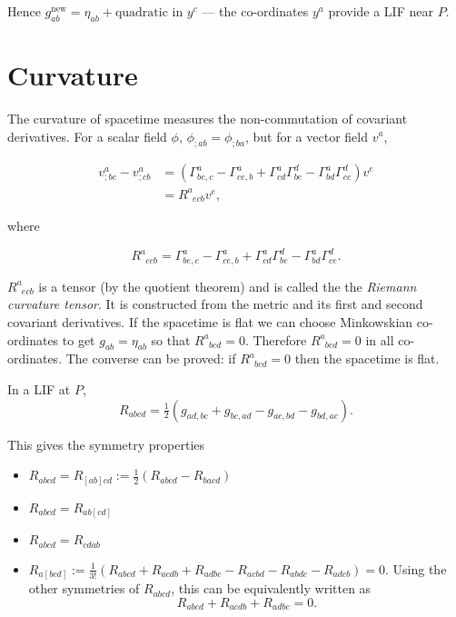 \documentclass{notes}
\begin{document}
Hence $g^{\text{new}}_{ab} = \eta_{ab} + \text{quadratic in $y^c$}$
--- the co-ordinates $y^a$ provide a LIF near $P$.

\section{Curvature}

The curvature of spacetime measures the non-commutation of covariant
derivatives.  For a scalar field $\phi$, $\phi_{;ab} = \phi_{;ba}$,
but for a vector field $v^a$,

\begin{align*}
v^a_{;bc} - v^a_{;cb} &= \left( \Gamma^a_{be,c} - \Gamma^a_{ce,b}
+ \Gamma^a_{cd} \Gamma^d_{be} - \Gamma^a_{bd} \Gamma^d_{ce}
\right) v^e \\
&= R^a_{\phantom{a} e c b} v^e,
\end{align*}

where

\[
R^a_{\phantom{a} e c b} = \Gamma^a_{be,c} - \Gamma^a_{ce,b}
+ \Gamma^a_{cd} \Gamma^d_{be} - \Gamma^a_{bd} \Gamma^d_{ce}.
\]

$R^a_{\phantom{a} e c b}$ is a tensor (by the quotient theorem) and is
called the the \emph{Riemann curvature tensor}.  It is constructed
from the metric and its first and second covariant derivatives.  If
the spacetime is flat we can choose Minkowskian co-ordinates to get
$g_{ab} = \eta_{ab}$ so that $R^a_{\phantom{a}bcd} = 0$.  Therefore
$R^a_{\phantom{a}bcd} = 0$ in all co-ordinates.  The converse can be
proved: if $R^a_{\phantom{a}bcd} = 0$ then the spacetime is flat.

In a LIF at $P$,
\[
R_{abcd} = \tfrac{1}{2} \left( g_{ad,bc} + g_{bc,ad} - g_{ac,bd} -
  g_{bd,ac} \right).
\]

This gives the symmetry properties

\begin{itemize}
\item $R_{abcd} = R_{[ab]cd} := \tfrac{1}{2} \left(R_{abcd} -
    R_{bacd}\right)$
\item $R_{abcd} = R_{ab[cd]}$
\item $R_{abcd} = R_{cdab}$
\item $R_{a[bcd]} := \tfrac{1}{3!} \left(R_{abcd} + R_{acdb} +
    R_{adbc} - R_{acbd} - R_{abdc} - R_{adcb}\right) = 0$.  Using the other
    symmetries of $R_{abcd}$, this can be equivalently written as
\[
R_{abcd} + R_{acdb} + R_{adbc} = 0.
\] 
\end{itemize}
\end{document}
